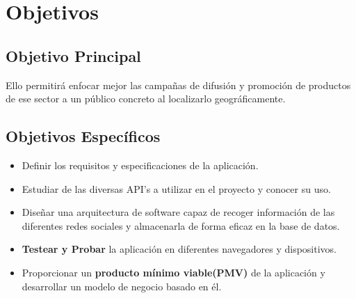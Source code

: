 \chapter{Objetivos}


\section{Objetivo Principal}


Ello permitirá enfocar mejor las campañas de difusión y promoción de productos de ese sector a un público concreto al localizarlo geográficamente.

\vspace{5 mm}

\section{Objetivos Específicos}

\begin{itemize}
  \item Definir los requisitos y especificaciones de la aplicación.
  \item Estudiar de las diversas API's a utilizar en el proyecto y conocer su uso.
  \item Diseñar una arquitectura de software capaz de recoger información de las diferentes redes sociales y almacenarla de forma eficaz en la base de datos.
  \item \textbf{Testear y Probar} la aplicación en diferentes navegadores y dispositivos.
  \item Proporcionar un \textbf{producto mínimo viable(PMV)} de la aplicación y desarrollar un modelo de negocio basado en él.
\end{itemize}

